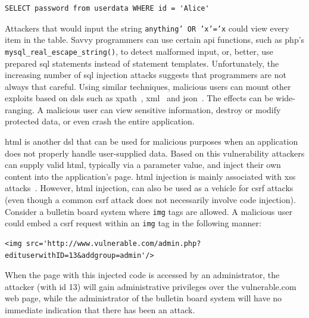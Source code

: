 \documentclass[10pt,journal,compsoc]{IEEEtran}
\begin{document}
\lstset{language=SQL}
\begin{lstlisting}
SELECT password from userdata WHERE id = 'Alice'
\end{lstlisting}

\noindent
Attackers that would input the string {\tt anything' OR 'x'='x}
could view every item in the table.
Savvy programmers can use certain {\sc api} functions, such as {\sc php}'s
{\tt mysql\_real\_escape\_string()}, to detect malformed input, or,
better, use prepared {\sc sql} statements instead of statement
templates. Unfortunately, the increasing number of {\sc sql} injection
attacks suggests that programmers are not always that careful. Using
similar techniques, malicious users can mount other exploits based on
{\sc dsl}s such as {\sc xp}ath~\cite{SW06,CDL07,MKS09}, {\sc
  xml}~\cite{MSM13} and {\sc json}~\cite{SMS13}. The effects can be
wide-ranging. A malicious user can view sensitive information, destroy
or modify protected data, or even crash the entire application.

{\sc html} is another {\sc dsl} that can be used for malicious
purposes when an application does not properly handle user-supplied
data. Based on this vulnerability attackers can supply valid {\sc
  html}, typically via a parameter value, and inject their own content
into the application's page. {\sc html} injection is mainly associated
with {\sc xss} attacks~\cite{SP11, SLMS14}. However, {\sc html} injection,
can also be used as a vehicle for {\sc csrf} attacks~\cite{BJM08, LZRL09}
(even though a common {\sc csrf} attack does not necessarily
involve code injection).
Consider a bulletin board system where {\tt img} tags are allowed.
A malicious user could embed a {\sc csrf} request within an
{\tt img} tag in the following manner:

\lstset{language=HTML}
\begin{lstlisting}
<img src='http://www.vulnerable.com/admin.php?edituserwithID=13&addgroup=admin'/>
\end{lstlisting}

\noindent
When the page with this injected code is accessed by an administrator,
the attacker (with {\sc id} 13) will gain administrative privileges
over the vulnerable.com web page,
while the administrator of the bulletin board system
will have no immediate indication that there has been an attack.
\end{document}
